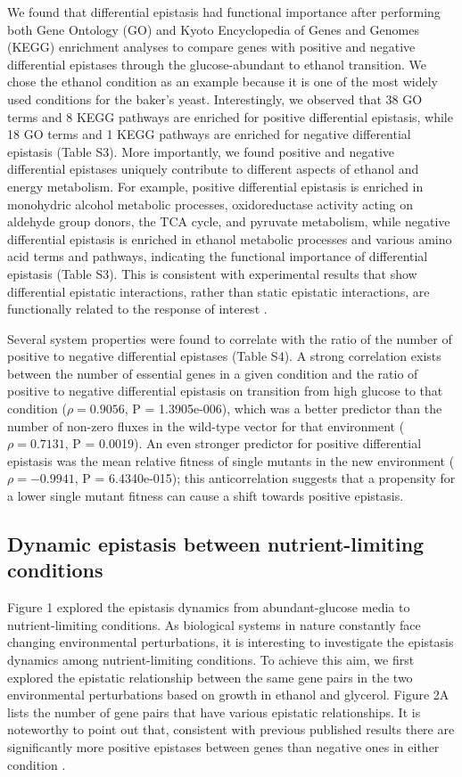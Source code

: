 We found that differential epistasis had functional importance after
performing both Gene Ontology (GO) and Kyoto Encyclopedia of Genes and
Genomes (KEGG) enrichment analyses to compare genes with positive and
negative differential epistases through the glucose-abundant to
ethanol transition. We chose the ethanol condition as an example
because it is one of the most widely used conditions for the baker’s
yeast. Interestingly, we observed that 38 GO terms and 8 KEGG pathways
are enriched for positive differential epistasis, while 18 GO terms
and 1 KEGG pathways are enriched for negative differential epistasis
(Table S3). More importantly, we found positive and negative
differential epistases uniquely contribute to different aspects of
ethanol and energy metabolism. For example, positive differential
epistasis is enriched in monohydric alcohol metabolic processes,
oxidoreductase activity acting on aldehyde group donors, the TCA
cycle, and pyruvate metabolism, while negative differential epistasis
is enriched in ethanol metabolic processes and various amino acid
terms and pathways, indicating the functional importance of
differential epistasis (Table S3). This is consistent with
experimental results that show differential epistatic interactions,
rather than static epistatic interactions, are functionally related to
the response of interest \citep{Bandyopadhyay2011}.

Several system properties were found to correlate with the ratio of
the number of positive to negative differential epistases (Table
S4). A strong correlation exists between the number of essential genes
in a given condition and the ratio of positive to negative
differential epistasis on transition from high glucose to that
condition ($\rho = 0.9056$, P = 1.3905e-006), which was a better predictor
than the number of non-zero fluxes in the wild-type vector for that
environment ($\rho = 0.7131$, P = 0.0019). An even stronger predictor for
positive differential epistasis was the mean relative fitness of
single mutants in the new environment ($\rho = -0.9941$, P = 6.4340e-015);
this anticorrelation suggests that a propensity for a lower single
mutant fitness can cause a shift towards positive epistasis.

\subsection{Dynamic epistasis between nutrient-limiting conditions}

Figure 1 explored the epistasis dynamics from abundant-glucose media
to nutrient-limiting conditions. As biological systems in nature
constantly face changing environmental perturbations, it is
interesting to investigate the epistasis dynamics among
nutrient-limiting conditions. To achieve this aim, we first explored
the epistatic relationship between the same gene pairs in the two
environmental perturbations based on growth in ethanol and
glycerol. Figure 2A lists the number of gene pairs that have various
epistatic relationships. It is noteworthy to point out that,
consistent with previous published results there are significantly
more positive epistases between genes than negative ones in either
condition \citep{He2010}.

